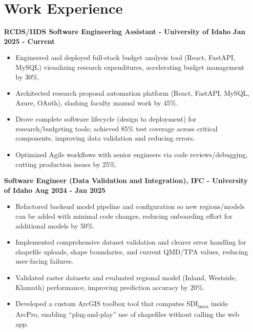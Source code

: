\documentclass[10pt]{article}
\begin{document}
\section*{Work Experience}
\textbf{RCDS/IIDS Software Engineering Assistant - University of Idaho} \hfill \textbf{Jan 2025 - Current}
\begin{itemize}[leftmargin=*, itemsep=1pt]
\item Engineered and deployed full-stack budget analysis tool (React, FastAPI, MySQL) visualizing research expenditures, accelerating budget management by 30\%.
\item Architected research proposal automation platform (React, FastAPI, MySQL, Azure, OAuth), slashing faculty manual work by 45\%.
\item Drove complete software lifecycle (design to deployment) for research/budgeting tools; achieved 85\% test coverage across critical components, improving data validation and reducing errors.
\item Optimized Agile workflows with senior engineers via code reviews/debugging, cutting production issues by 25\%.
\end{itemize}

\textbf{Software Engineer (Data Validation and Integration), IFC - University of Idaho} \hfill \textbf{Aug 2024 - Jan 2025}
\begin{itemize}[leftmargin=*, itemsep=1pt]
\item Refactored backend model pipeline and configuration so new regions/models can be added with minimal code changes, reducing onboarding effort for additional models by 50\%.
\item Implemented comprehensive dataset validation and clearer error handling for shapefile uploads, shape boundaries, and current QMD/TPA values, reducing user-facing failures.
\item Validated raster datasets and evaluated regional model (Inland, Westside, Klamath) performance, improving prediction accuracy by 20\%.

\item Developed a custom ArcGIS toolbox tool that computes SDI\textsubscript{max} inside ArcPro, enabling “plug‑and‑play” use of shapefiles without calling the web app.
\end{itemize}
\end{document}
